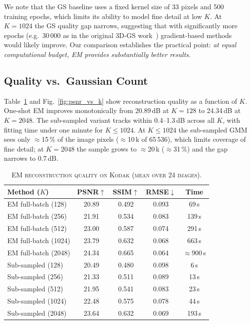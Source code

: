\documentclass[a4paper,conference]{IEEEtran}
\begin{document}
We note that the GS baseline uses a fixed kernel size of 33 pixels and
500 training epochs, which limits its ability to model fine detail at low $K$.
At $K\!=\!1024$ the GS quality gap narrows, suggesting that with
significantly more epochs (e.g.\ 30\,000 as in the original 3D-GS
work~\cite{kerbl3Dgaussians}) gradient-based methods would likely improve.
Our comparison establishes the practical point: \emph{at equal computational
budget, EM provides substantially better results}.

\subsection{Quality vs.\ Gaussian Count}
\label{subsec:quality_vs_k}

Table~\ref{tab:results} and Fig.~\ref{fig:psnr_vs_k} show reconstruction
quality as a function of $K$.
One-shot EM improves monotonically from 20.89\,dB at $K\!=\!128$ to
24.34\,dB at $K\!=\!2048$.
The sub-sampled variant tracks within 0.4--1.3\,dB across all $K$, with
fitting time under one minute for $K\!\leq\!1024$.
At $K\!\leq\!1024$ the sub-sampled GMM sees only $\approx$15\,\%
of the image pixels ($\approx$10\,k of 65\,536), which limits coverage
of fine detail; at $K\!=\!2048$ the sample grows to
$\approx$20\,k ($\approx$31\,\%) and the gap narrows to 0.7\,dB.

\begin{table}[!t]
\renewcommand{\arraystretch}{1.3}
\caption{\textsc{EM reconstruction quality on Kodak (mean over 24 images).}}
\label{tab:results}
\centering
\begin{tabular}{|l|c|c|c|c|}
\hline
\textbf{Method ($K$)} & \textbf{PSNR$\uparrow$} & \textbf{SSIM$\uparrow$} & \textbf{RMSE$\downarrow$} & \textbf{Time} \\
\hline
EM full-batch (128)  & 20.89 & 0.492 & 0.093 & 69\,s \\
EM full-batch (256)  & 21.91 & 0.534 & 0.083 & 139\,s \\
EM full-batch (512)  & 23.00 & 0.587 & 0.074 & 291\,s \\
EM full-batch (1024) & 23.79 & 0.632 & 0.068 & 663\,s \\
EM full-batch (2048) & 24.34 & 0.665 & 0.064 & $\approx$900\,s \\
\hline
Sub-sampled (128)  & 20.49 & 0.480 & 0.098 &   6\,s \\
Sub-sampled (256)  & 21.33 & 0.511 & 0.089 &  13\,s \\
Sub-sampled (512)  & 21.95 & 0.541 & 0.083 &  23\,s \\
Sub-sampled (1024) & 22.48 & 0.575 & 0.078 &  44\,s \\
Sub-sampled (2048) & 23.64 & 0.632 & 0.069 & 193\,s \\
\hline
\end{tabular}
\end{table}
\end{document}
